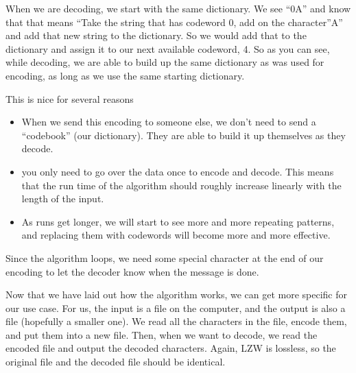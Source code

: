 \documentclass[12pt,twoside]{reedthesis}
\providecommand{\tightlist}{%
  \setlength{\itemsep}{0pt}\setlength{\parskip}{0pt}}
\begin{document}
When we are decoding, we start with the same dictionary. We see ``0A'' and know that that means ``Take the string that has codeword 0, add on the character''A'' and add that new string to the dictionary. So we would add that to the dictionary and assign it to our next available codeword, 4. So as you can see, while decoding, we are able to build up the same dictionary as was used for encoding, as long as we use the same starting dictionary.

This is nice for several reasons
\begin{itemize}
\tightlist
\item
  When we send this encoding to someone else, we don't need to send a ``codebook'' (our dictionary). They are able to build it up themselves as they decode.
\item
  you only need to go over the data once to encode and decode. This means that the run time of the algorithm should roughly increase linearly with the length of the input.
\item
  As runs get longer, we will start to see more and more repeating patterns, and replacing them with codewords will become more and more effective.
\end{itemize}
Since the algorithm loops, we need some special character at the end of our encoding to let the decoder know when the message is done.

Now that we have laid out how the algorithm works, we can get more specific for our use case. For us, the input is a file on the computer, and the output is also a file (hopefully a smaller one). We read all the characters in the file, encode them, and put them into a new file. Then, when we want to decode, we read the encoded file and output the decoded characters. Again, LZW is lossless, so the original file and the decoded file should be identical.
\end{document}
